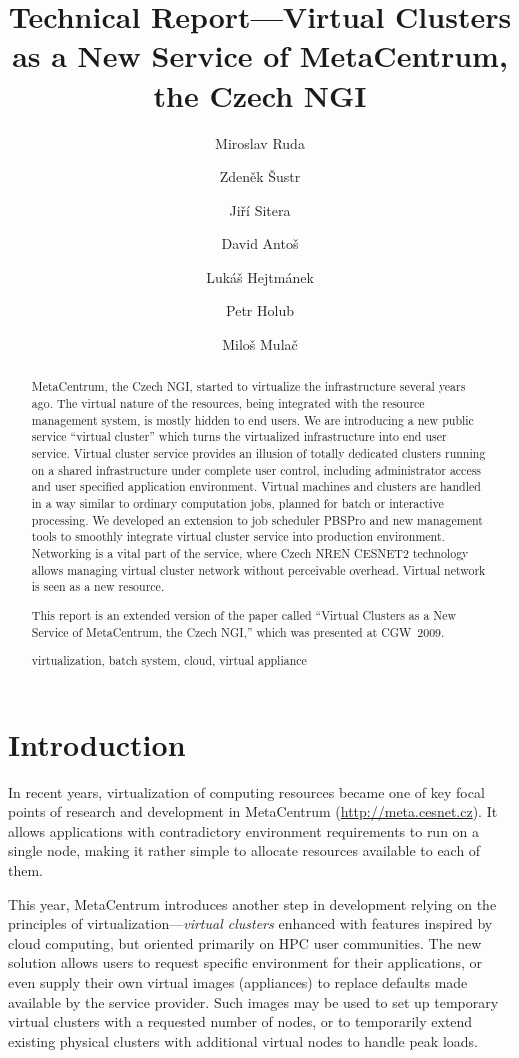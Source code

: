 \documentclass[a4paper]{article}
\title{Technical Report---Virtual Clusters as a New Service of MetaCentrum, the Czech NGI}
\author{Miroslav Ruda \and Zden\v ek \v Sustr \and Ji\v r\' i Sitera \and David Anto\v s \and Luk\'a\v s Hejtm\' anek \and Petr Holub \and Milo\v s Mula\v c}
\begin{document}
\maketitle


\begin{abstract}
MetaCentrum, the Czech NGI, started to virtualize the infrastructure several years ago.
The virtual nature of the resources, being integrated with the resource management system, is mostly hidden to end users.
We are introducing a new public service ``virtual cluster'' which turns the virtualized infrastructure
into end user service. Virtual cluster service provides an illusion of totally dedicated clusters
running on a shared infrastructure under complete user control, including administrator access and
user specified application environment. Virtual machines and clusters are handled in a way similar to
ordinary computation jobs, planned for batch or interactive processing. We developed an extension to
job scheduler PBSPro and new management tools to smoothly integrate virtual cluster service into
production environment. Networking is a vital part of the service, where Czech NREN CESNET2
technology allows managing virtual cluster network without perceivable overhead. Virtual network
is seen as a new resource.

This report is an extended version of the paper
called ``Virtual Clusters as a New Service of MetaCentrum, the Czech NGI,'' which was presented
at CGW~2009.

 virtualization, batch system, cloud, virtual appliance
\end{abstract}


\section{Introduction}

In recent years, virtualization of computing resources became one of key focal points of research and development
in MetaCentrum (\url{http://meta.cesnet.cz}). It allows applications with contradictory environment requirements to run on a single node, making it rather simple
to allocate resources available to each of them.

This year, MetaCentrum
introduces another step in development relying on the principles of virtualization---\emph{virtual clusters} enhanced with features
inspired by cloud computing, but oriented primarily on HPC user communities. The new solution allows users to request specific environment for their applications,
or even supply their own virtual images (appliances) to replace defaults made available by the service provider. Such images may be used to set up temporary
virtual clusters with a requested number of nodes, or to temporarily extend existing physical clusters with additional virtual nodes to handle peak loads.
\end{document}
